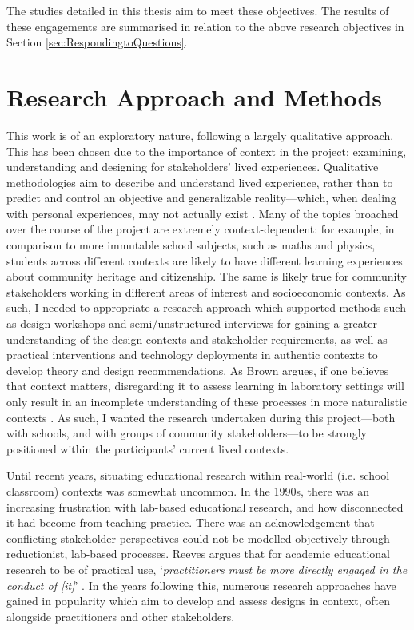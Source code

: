 The studies detailed in this thesis aim to meet these objectives. The results of these engagements are summarised in relation to the above research objectives in Section \ref{sec:RespondingtoQuestions}.

\section{Research Approach and Methods}
\label{sec:ResearchApproach}

This work is of an exploratory nature, following a largely qualitative approach. This has been chosen due to the importance of context in the project: examining, understanding and designing for stakeholders' lived experiences. Qualitative methodologies aim to describe and understand lived experience, rather than to predict and control an objective and generalizable reality---which, when dealing with personal experiences, may not actually exist \citep{macdonald2012}. Many of the topics broached over the course of the project are extremely context-dependent: for example, in comparison to more immutable school subjects, such as maths and physics, students across different contexts are likely to have different learning experiences about community heritage and citizenship. The same is likely true for community stakeholders working in different areas of interest and socioeconomic contexts. As such, I needed to appropriate a research approach which supported methods such as design workshops and semi/unstructured interviews for gaining a greater understanding of the design contexts and stakeholder requirements, as well as practical interventions and technology deployments in authentic contexts to develop theory and design recommendations. As Brown argues, if one believes that context matters, disregarding it to assess learning in laboratory settings will only result in an incomplete understanding of these processes in more naturalistic contexts \citep{brown1992}. As such, I wanted the research undertaken during this project---both with schools, and with groups of community stakeholders---to be strongly positioned within the participants' current lived contexts.

Until recent years, situating educational research within real-world (i.e. school classroom) contexts was somewhat uncommon. In the 1990s, there was an increasing frustration with lab-based educational research, and how disconnected it had become from teaching practice. There was an acknowledgement that conflicting stakeholder perspectives could not be modelled objectively through reductionist, lab-based processes. Reeves argues that for academic educational research to be of practical use, `\textit{practitioners must be more directly engaged in the conduct of [it]}' \citep{reeves2000}. In the years following this, numerous research approaches have gained in popularity which aim to develop and assess designs in context, often alongside practitioners and other stakeholders. 


